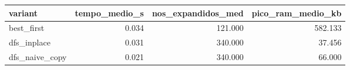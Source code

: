 \begin{tabular}{lrrr}
\toprule
variant & tempo\_medio\_s & nos\_expandidos\_med & pico\_ram\_medio\_kb \\
\midrule
best\_first & 0.034 & 121.000 & 582.133 \\
dfs\_inplace & 0.031 & 340.000 & 37.456 \\
dfs\_naive\_copy & 0.021 & 340.000 & 66.000 \\
\bottomrule
\end{tabular}
